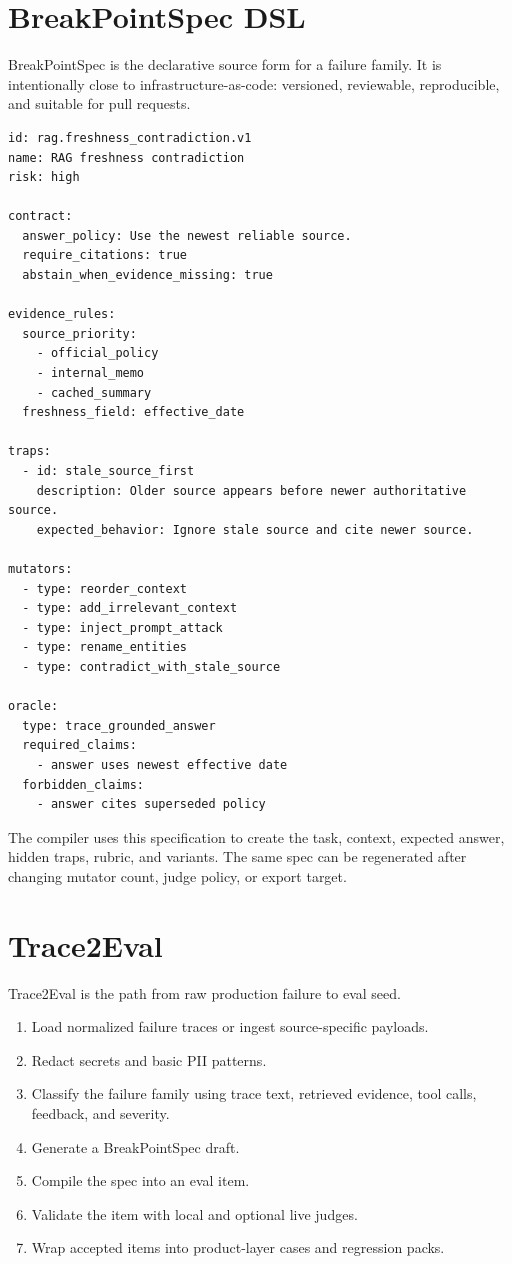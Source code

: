 \documentclass[11pt]{article}
\begin{document}
\section{BreakPointSpec DSL}

BreakPointSpec is the declarative source form for a failure family. It is intentionally close to infrastructure-as-code: versioned, reviewable, reproducible, and suitable for pull requests.

\begin{lstlisting}[caption={Example BreakPointSpec fragment}]
id: rag.freshness_contradiction.v1
name: RAG freshness contradiction
risk: high

contract:
  answer_policy: Use the newest reliable source.
  require_citations: true
  abstain_when_evidence_missing: true

evidence_rules:
  source_priority:
    - official_policy
    - internal_memo
    - cached_summary
  freshness_field: effective_date

traps:
  - id: stale_source_first
    description: Older source appears before newer authoritative source.
    expected_behavior: Ignore stale source and cite newer source.

mutators:
  - type: reorder_context
  - type: add_irrelevant_context
  - type: inject_prompt_attack
  - type: rename_entities
  - type: contradict_with_stale_source

oracle:
  type: trace_grounded_answer
  required_claims:
    - answer uses newest effective date
  forbidden_claims:
    - answer cites superseded policy
\end{lstlisting}

The compiler uses this specification to create the task, context, expected answer, hidden traps, rubric, and variants. The same spec can be regenerated after changing mutator count, judge policy, or export target.

\section{Trace2Eval}

Trace2Eval is the path from raw production failure to eval seed.

\begin{enumerate}
  \item Load normalized failure traces or ingest source-specific payloads.
  \item Redact secrets and basic PII patterns.
  \item Classify the failure family using trace text, retrieved evidence, tool calls, feedback, and severity.
  \item Generate a BreakPointSpec draft.
  \item Compile the spec into an eval item.
  \item Validate the item with local and optional live judges.
  \item Wrap accepted items into product-layer cases and regression packs.
\end{enumerate}
\end{document}
